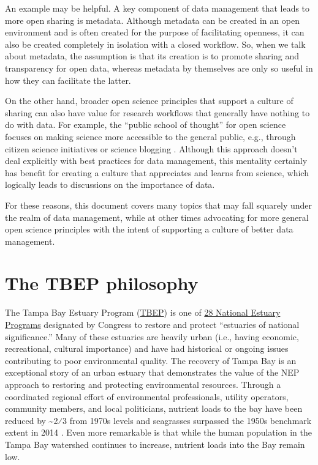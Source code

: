 \documentclass[
]{book}
\begin{document}
An example may be helpful. A key component of data management that leads to more open sharing is metadata. Although metadata can be created in an open environment and is often created for the purpose of facilitating openness, it can also be created completely in isolation with a closed workflow. So, when we talk about metadata, the assumption is that its creation is to promote sharing and transparency for open data, whereas metadata by themselves are only so useful in how they can facilitate the latter.

On the other hand, broader open science principles that support a culture of sharing can also have value for research workflows that generally have nothing to do with data. For example, the ``public school of thought'' for open science focuses on making science more accessible to the general public, e.g., through citizen science initiatives or science blogging \citep{Fecher14}. Although this approach doesn't deal explicitly with best practices for data management, this mentality certainly has benefit for creating a culture that appreciates and learns from science, which logically leads to discussions on the importance of data.

For these reasons, this document covers many topics that may fall squarely under the realm of data management, while at other times advocating for more general open science principles with the intent of supporting a culture of better data management.

\hypertarget{philogeneral}{%
\section{The TBEP philosophy}\label{philogeneral}}

The Tampa Bay Estuary Program (\href{https://www.tbep.org}{TBEP}) is one of \href{http://nationalestuaries.org/}{28 National Estuary Programs} designated by Congress to restore and protect ``estuaries of national significance.'' Many of these estuaries are heavily urban (i.e., having economic, recreational, cultural importance) and have had historical or ongoing issues contributing to poor environmental quality. The recovery of Tampa Bay is an exceptional story of an urban estuary that demonstrates the value of the NEP approach to restoring and protecting environmental resources. Through a coordinated regional effort of environmental professionals, utility operators, community members, and local politicians, nutrient loads to the bay have been reduced by \textasciitilde2⁄3 from 1970s levels and seagrasses surpassed the 1950s benchmark extent in 2014 \citep{Greening14, Sherwood17}. Even more remarkable is that while the human population in the Tampa Bay watershed continues to increase, nutrient loads into the Bay remain low.
\end{document}
